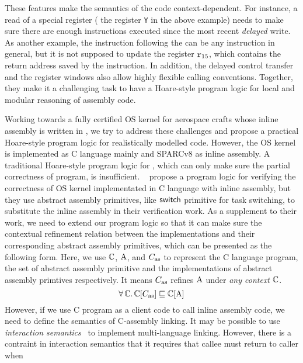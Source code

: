 These features make the semantics of the \sparc{} code
context-dependent. For instance, a read of a special register
(\eg{} the register {\tt Y} in the above example) needs to
make sure there are enough instructions executed since the
most recent {\em delayed} write. As another example,
the instruction following the \call{} can be any
instruction in general, but it is not supposed to
update the register $\texttt{r}_{15}$, which contains the return
address saved by the \call{} instruction.
In addition,
the delayed control transfer
and the register windows also allow highly flexible calling
conventions. Together, they make it a challenging task
to have a Hoare-style program logic for local and modular
reasoning of \sparc{} assembly code.

Working towards a fully certified OS kernel for aerospace
crafts whose inline assembly is written in \sparc,
we try to address these challenges and propose a practical
Hoare-style program logic for realistically modelled \sparc{} code.
However, the OS kernel is implemented as 
C language mainly and SPARCv8 as inline assembly. 
A traditional Hoare-style program logic 
for \sparc{}, which can only make sure the 
partial correctness of \sparc{} program, is insufficient.
~\cite{Xu16cav} propose a program logic for 
verifying the correctness of OS kernel implementated in 
C language with inline assembly, 
but they use abstract assembly primitives, 
like $\mathsf{switch}$ primitive for task switching, to 
substitute the inline assembly in their verification work.
As a supplement to their work, we need to extend our 
program logic so that it can make sure the  
contextual refinement relation between the implementations
and their corresponding abstract assembly primitives, 
which can be presented as the following form. Here,  
we use $\mathbb{C}$, $\text{A}$, and $C_{\text{as}}$ to represent 
the C language program, the set of abstract assembly 
primitive and the implementations of 
abstract assembly primtives respectively. 
It means $C_{\text{as}}$ refines $\text{A}$ under 
\textit{any context} $\mathbb{C}$. 
\[
    \forall \, \mathbb{C}. \, 
    \mathbb{C}[C_{\text{as}}] \sqsubseteq \mathbb{C}[\text{A}]
\]
However, if we use C program as a client code to 
call inline assembly code, we need to define the 
semantics of C-assembly linking. 
It may be possible to use
\textit{interaction semantics}~\cite{Stewart15popl}
to implement multi-language linking. However, 
there is a contraint in interaction semantics that 
it requires that callee must return to caller when 
